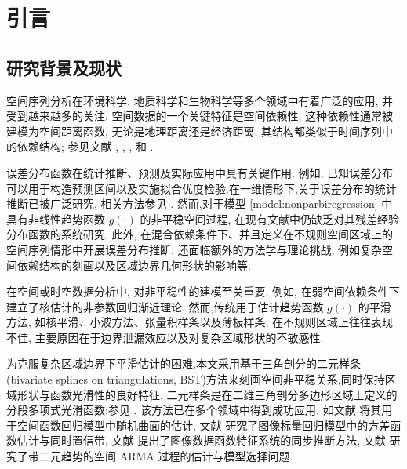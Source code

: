 \documentclass[a4paper,openay,14pt]{ctexbook}
\numberwithin{equation}{section}
\numberwithin{lem}{section}
\newcommand{\chapterwithfancyheader}[1]{  
    \chapter{#1} %
    \thispagestyle{fancy} %
}
\begin{document}

\newpage
{}

\clearpage %
\tableofcontents
\thispagestyle{empty}
\listoftables
\let\cleardoublepage\clearpage
\listoffigures

\mainmatter
\pagestyle{fancy}\fancyhf{}
\fancyhead[EL]{\leftmark}
\fancyhead[OR]{\leftmark}
\fancyfoot[C]{\thepage }

\chapterwithfancyheader{引言}
\section{研究背景及现状}

空间序列分析在环境科学, 地质科学和生物科学等多个领域中有着广泛的应用, 并受到越来越多的关注. 
空间数据的一个关键特征是空间依赖性, 这种依赖性通常被建模为空间距离函数, 
无论是地理距离还是经济距离, 其结构都类似于时间序列中的依赖结构; 
参见文献 \cite{whittle1954stationary}, \cite{anselin1980estimation}, 
\cite{yao2006gaussian}, \cite{robinson2011asymptotic} 和 \cite{cressie2015statistics}.

误差分布函数在统计推断、预测及实际应用中具有关键作用. 例如, 已知误差分布可以用于构造预测区间以及实施拟合优度检验.在一维情形下,关于误差分布的统计推断已被广泛研究, 相关方法参见
\cite{akritas2001non, cheng2002consistency, cheng2005asymptotic, muller2007estimating, chan2008residual, kiwitt2012estimating, gu2021smooth, zhong2025inference}.
然而,对于模型 \eqref{model:nonparbiregression} 中具有非线性趋势函数 \( g(\cdot) \) 的非平稳空间过程, 在现有文献中仍缺乏对其残差经验分布函数的系统研究. 此外, 在混合依赖条件下、并且定义在不规则空间区域上的空间序列情形中开展误差分布推断, 还面临额外的方法学与理论挑战, 例如复杂空间依赖结构的刻画以及区域边界几何形状的影响等.

在空间或时空数据分析中, 对非平稳性的建模至关重要. 例如,\cite{robinson2011asymptotic} 在弱空间依赖条件下建立了核估计的非参数回归渐近理论. 然而,传统用于估计趋势函数 \( g(\cdot) \) 的平滑方法, 如核平滑、小波方法、张量积样条以及薄板样条, 在不规则区域上往往表现不佳, 主要原因在于边界泄漏效应以及对复杂区域形状的不敏感性.

为克服复杂区域边界下平滑估计的困难,本文采用基于三角剖分的二元样条(bivariate splines on triangulations, BST)方法来刻画空间非平稳关系,同时保持区域形状与函数光滑性的良好特征. 二元样条是在二维三角剖分多边形区域上定义的分段多项式光滑函数;参见 \cite{lai2013bivariate}. 该方法已在多个领域中得到成功应用, 如文献\cite{guillas2010bivariate} 将其用于空间函数回归模型中随机曲面的估计, 文献\cite{yu2021multivariate} 研究了图像标量回归模型中的方差函数估计与同时置信带, 文献\cite{hu2024statistical} 提出了图像数据函数特征系统的同步推断方法, 文献\cite{zhang2025oracally} 研究了带二元趋势的空间 ARMA 过程的估计与模型选择问题.
\end{document}
